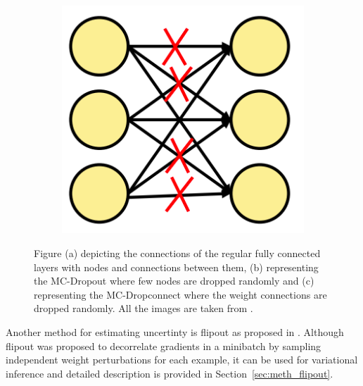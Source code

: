 \begin{figure}[htbp]
\begin{subfigure}{0.33\textwidth}
            \caption{}
            \label{fig:SOTA_Dropout}
        \end{subfigure}
        \begin{subfigure}{0.33\textwidth}
            \centering
            \includegraphics[scale=0.33]{images/DConnect_SOTA.png}
            \caption{}
            \label{fig:SOTA_Dconnect}
        \end{subfigure}
        \caption{Figure (a) depicting the connections of the regular fully connected layers with nodes and connections between them,
        (b) representing the MC-Dropout where few nodes are dropped randomly and 
        (c) representing the MC-Dropconnect where the weight connections are dropped randomly. All the images are taken from \cite{UQ_Survey}.}
        \label{fig:Dropout_Connect}
    \end{figure}
    Another method for estimating uncertinty is flipout as proposed in \cite{Flipout}.
    Although flipout was proposed to decorrelate gradients in a minibatch by sampling independent weight perturbations for each example, it can be used for variational inference and detailed description is provided in Section~\ref{sec:meth_flipout}.
    
    

